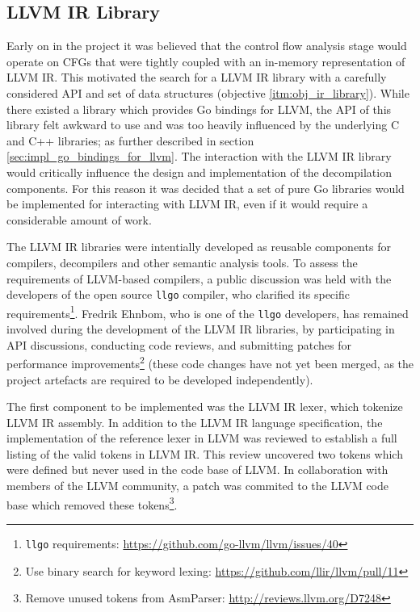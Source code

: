 
\subsection{LLVM IR Library}
\label{sec:impl_llvm_ir_library}

Early on in the project it was believed that the control flow analysis stage would operate on CFGs that were tightly coupled with an in-memory representation of LLVM IR. This motivated the search for a LLVM IR library with a carefully considered API and set of data structures (objective \ref{itm:obj_ir_library}). While there existed a library which provides Go bindings for LLVM, the API of this library felt awkward to use and was too heavily influenced by the underlying C and C++ libraries; as further described in section \ref{sec:impl_go_bindings_for_llvm}. The interaction with the LLVM IR library would critically influence the design and implementation of the decompilation components. For this reason it was decided that a set of pure Go libraries would be implemented for interacting with LLVM IR, even if it would require a considerable amount of work.


The LLVM IR libraries were intentially developed as reusable components for compilers, decompilers and other semantic analysis tools. To assess the requirements of LLVM-based compilers, a public discussion was held with the developers of the open source \texttt{llgo} compiler, who clarified its specific requirements\footnote{\texttt{llgo} requirements: \url{https://github.com/go-llvm/llvm/issues/40}}. Fredrik Ehnbom, who is one of the \texttt{llgo} developers, has remained involved during the development of the LLVM IR libraries, by participating in API discussions, conducting code reviews, and submitting patches for performance improvements\footnote{Use binary search for keyword lexing: \url{https://github.com/llir/llvm/pull/11}} (these code changes have not yet been merged, as the project artefacts are required to be developed independently).

The first component to be implemented was the LLVM IR lexer, which tokenize LLVM IR assembly. In addition to the LLVM IR language specification, the implementation of the reference lexer in LLVM was reviewed to establish a full listing of the valid tokens in LLVM IR. This review uncovered two tokens which were defined but never used in the code base of LLVM. In collaboration with members of the LLVM community, a patch was commited to the LLVM code base which removed these tokens\footnote{Remove unused tokens from AsmParser: \url{http://reviews.llvm.org/D7248}}.

